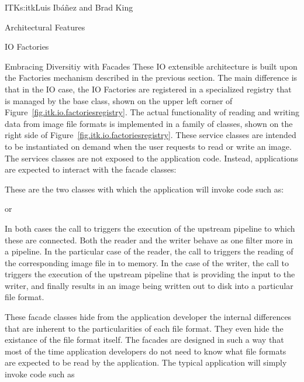 \begin{aosachapter}{ITK}{s:itk}{Luis Ib\'{a}\~{n}ez and Brad King}
\begin{aosasect1}{Architectural Features}
\begin{aosasect2}{IO Factories}
\begin{aosasect3}{Embracing Diversitiy with Facades}
These IO extensible architecture is built upon the Factories mechanism
described in the previous section. The main difference is that in the IO case,
the IO Factories are registered in a specialized registry that is managed by
the  base class, shown on the upper left corner of
Figure~\ref{fig.itk.io.factoriesregistry}. The actual functionality of reading
and writing data from image file formats is implemented in a family of
 classes, shown on the right side of
Figure~\ref{fig.itk.io.factoriesregistry}. These service classes are intended
to be instantiated on demand when the user requests to read or write an image.
The services classes are not exposed to the application code. Instead,
applications are expected to interact with the facade classes:

\begin{aosaitemize}
\item {}
\item {}
\end{aosaitemize}

These are the two classes with which the application will invoke code such as:

\begin{aosaitemize}
\item {}
\item {}
\end{aosaitemize}

or

\begin{aosaitemize}
\item {}
\item {}
\end{aosaitemize}

In both cases the call to  triggers the execution of the
upstream pipeline to which these  are connected. Both the
reader and the writer behave as one filter more in a pipeline. In the
particular case of the reader, the call to  triggers the reading
of the corresponding image file in to memory. In the case of the writer, the
call to  triggers the execution of the upstream pipeline that is
providing the input to the writer, and finally results in an image being
written out to disk into a particular file format.

These facade classes hide from the application developer the
internal differences that are inherent to the particularities of
each file format. They even hide the existance of the file format
itself. The facades are designed in such a way that most of the
time application developers do not need to know what file formats
are expected to be read by the application. The typical
application will simply invoke code such as


\end{aosasect3}
\end{aosasect2}
\end{aosasect1}
\end{aosachapter}
